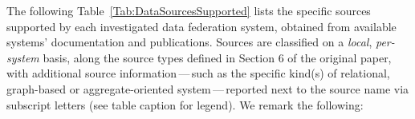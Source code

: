 \documentclass[
  sw             %
]
{iosart2x}
\begin{document}














\newpage
The following Table~\ref{Tab:DataSourcesSupported} lists the specific sources supported by each investigated data federation system, obtained from available systems' documentation and publications. Sources are classified on a \emph{local}, \emph{per-system} basis, along the source types defined in Section 6 of the original paper, with additional source information\,---\,such as the specific kind(s) of relational, graph-based or aggregate-oriented system\,---\,reported next to the source name via subscript letters (see table caption for legend).
We remark the following:
\end{document}
